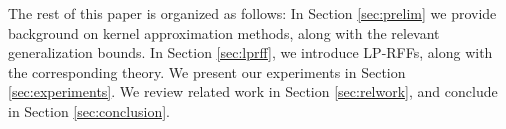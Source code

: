 The rest of this paper is organized as follows:   In Section \ref{sec:prelim} we provide background on kernel approximation methods, along with the relevant generalization bounds. In Section \ref{sec:lprff}, we introduce LP-RFFs, along with the corresponding theory.  We present our experiments in Section \ref{sec:experiments}.  We review related work in Section \ref{sec:relwork}, and conclude in Section \ref{sec:conclusion}.



